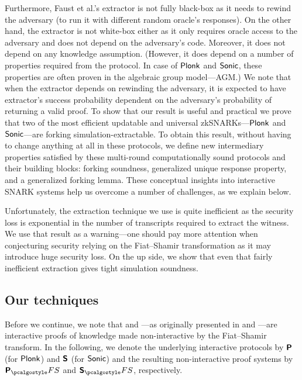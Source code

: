 \documentclass[runningheads,10pt]{llncs}
\begin{document}
Furthermore, Faust et al.'s extractor is not fully black-box as it needs to
rewind the adversary (to run it with different random oracle's responses). On
the other hand, the extractor is not white-box either as it only requires oracle
access to the adversary and does not depend on the adversary's code. Moreover,
it does not depend on any knowledge assumption.  (However, it does depend on a
number of properties required from the protocol. In case of $\textnormal{\textsf{Plonk}}$ and
${\textnormal{\textsf{Sonic}}}$, these properties are often proven in the algebraic group model---AGM.)
We note that when the extractor depends on rewinding the adversary, it is
expected to have extractor's success probability dependent on the adversary's
probability of returning a valid proof.  To show that our result is useful and
practical we prove that two of the most efficient updatable and universal
zkSNARKs---$\textnormal{\textsf{Plonk}}$ and ${\textnormal{\textsf{Sonic}}}$---are forking simulation-extractable. To obtain
this result, without having to change anything at all in these protocols, we
define new intermediary properties satisfied by these multi-round
computationally sound protocols and their building blocks: forking soundness,
generalized unique response property, and a generalized forking lemma. These conceptual
insights into interactive SNARK systems help us overcome a number of challenges,
as we explain below.

Unfortunately, the extraction technique we use is quite inefficient as the
security loss is exponential in the number of transcripts required to extract
the witness. We use that result as a warning---one should pay more attention
when conjecturing security relying on the Fiat--Shamir transformation as it may
introduce huge security loss.  On the up side, we show that even that fairly
inefficient extraction gives tight simulation soundness.

\subsection{Our techniques}
Before we continue, we note that \plonk{} and \sonic{}---as originally presented
in \cite{EPRINT:GabWilCio19} and \cite{CCS:MBKM19}---are interactive proofs of
knowledge made non-interactive by the Fiat--Shamir transform. In the following,
we denote the underlying interactive protocols by $\bm{\mathsf{P}}$ (for $\textnormal{\textsf{Plonk}}$)
and $\bm{\mathsf{S}}$ (for ${\textnormal{\textsf{Sonic}}}$) and the resulting non-interactive proof systems by
$\plonkprotfs$ and $\sonicprotfs$, respectively.
\end{document}
